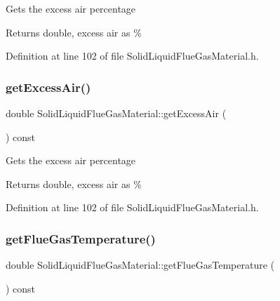 Gets the excess air percentage \begin{DoxyReturn}{Returns}
double, excess air as \% 
\end{DoxyReturn}


Definition at line 102 of file Solid\+Liquid\+Flue\+Gas\+Material.\+h.

\mbox{\label{class_solid_liquid_flue_gas_material_a49e7bb4ebc45897c81b6f38610ceaf02}} 
\subsubsection{\texorpdfstring{get\+Excess\+Air()}{getExcessAir()}\hspace{0.1cm}{\footnotesize\ttfamily [3/3]}}
{\footnotesize\ttfamily double Solid\+Liquid\+Flue\+Gas\+Material\+::get\+Excess\+Air (\begin{DoxyParamCaption}{ }\end{DoxyParamCaption}) const\hspace{0.3cm}{\ttfamily [inline]}}

Gets the excess air percentage \begin{DoxyReturn}{Returns}
double, excess air as \% 
\end{DoxyReturn}


Definition at line 102 of file Solid\+Liquid\+Flue\+Gas\+Material.\+h.

\mbox{\label{class_solid_liquid_flue_gas_material_aba4604158b3c624496d7de4b5fb511e2}} 
\subsubsection{\texorpdfstring{get\+Flue\+Gas\+Temperature()}{getFlueGasTemperature()}\hspace{0.1cm}{\footnotesize\ttfamily [1/3]}}
{\footnotesize\ttfamily double Solid\+Liquid\+Flue\+Gas\+Material\+::get\+Flue\+Gas\+Temperature (\begin{DoxyParamCaption}{ }\end{DoxyParamCaption}) const\hspace{0.3cm}{\ttfamily [inline]}}

